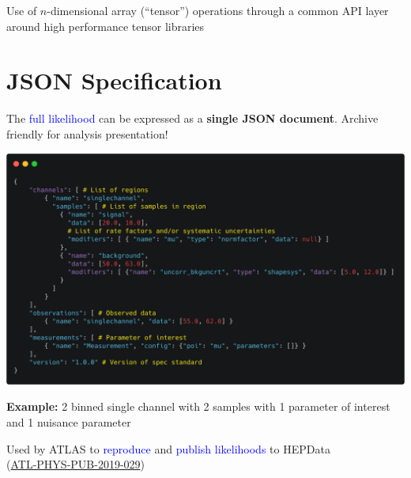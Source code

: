 \documentclass[princeton,portrait]{a0poster}
\begin{document}
\begin{multicols}{2}
 \noindent Use of $n$-dimensional array (``tensor'') operations through a common API layer around high performance tensor libraries

 \section*{\LARGE\color{MediumBlue} JSON Specification}
 The \textcolor{blue}{full likelihood} can be expressed as a \textbf{single JSON document}.
 Archive friendly for analysis presentation!
 \vspace{0.5em}
 \begin{center}
  \href{https://raw.githubusercontent.com/scikit-hep/pyhf/master/docs/examples/json/2-bin_1-channel.json}{\includegraphics[width=0.5\linewidth]{carbon_JSON_spec_annotated.png}}

  {\small\textbf{Example:} 2 binned single channel with 2 samples with 1 parameter of interest and 1 nuisance parameter}
 \end{center}
 \noindent Used by ATLAS to \textcolor{blue}{reproduce} and \textcolor{blue}{publish likelihoods} to HEPData\\(\textcolor{blue}{\href{https://atlas.web.cern.ch/Atlas/GROUPS/PHYSICS/PUBNOTES/ATL-PHYS-PUB-2019-029/}{ATL-PHYS-PUB-2019-029}})


\end{multicols}
\end{document}
